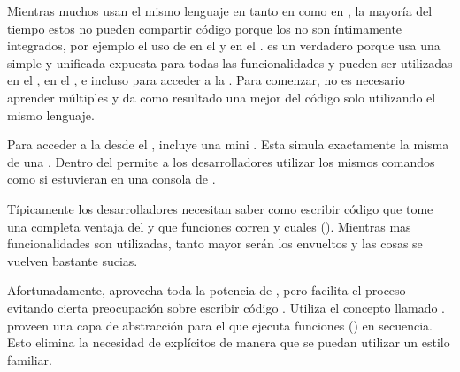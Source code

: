 Mientras muchos \frameworks usan el mismo lenguaje en tanto en \client como en \server, la mayoría del tiempo estos no pueden compartir código porque los \frameworks no son íntimamente integrados, por ejemplo el uso de \angularjs en el \frontend y \expressjs en el \backend. \meteor es un \fullstack verdadero porque usa una simple y unificada \api expuesta para todas las funcionalidades \core y pueden ser utilizadas en el \server, en el \browser, e incluso para acceder a la \database. Para comenzar, no es necesario aprender múltiples \frameworks y da como resultado una mejor \reusability del código solo utilizando el mismo lenguaje.

Para acceder a la \database desde el \browser, \meteor incluye una mini \database. Esta simula exactamente la misma \api de una \database. Dentro del \browser \minimongo permite a los desarrolladores utilizar los mismos comandos como si estuvieran en una consola de \mongodb.

Típicamente los desarrolladores necesitan saber como escribir código que tome una completa ventaja del \eventloop y que funciones corren \synchronously y cuales \asynchronously (). Mientras mas funcionalidades \asynchronously son utilizadas, tanto mayor serán los \callbacks envueltos y las cosas se vuelven bastante sucias.

Afortunadamente, \meteor aprovecha toda la potencia de \eventloop, pero facilita el proceso evitando cierta preocupación sobre escribir código \asynchronous. Utiliza el concepto llamado \fibers \behindthescenes. \fibers proveen una capa de abstracción para el \eventloop que ejecuta funciones \asynchronous(\tasks) en secuencia. Esto elimina la necesidad de \callbacks explícitos de manera que se puedan utilizar un estilo \synchronous familiar.

